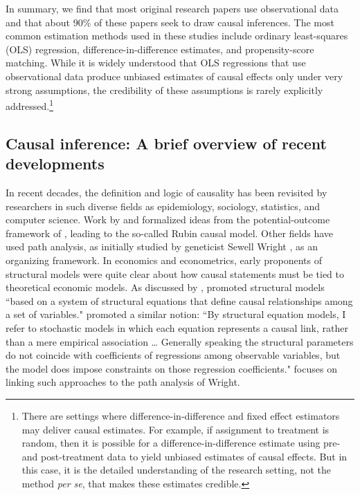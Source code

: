 \documentclass[12pt,reqno,titlepage]{amsart}
\begin{document}
\begin{doublespace}
In summary, we find that most original research papers use observational data and that about 90\% of these papers seek to draw causal inferences.
The most common estimation methods used in these studies include ordinary least-squares (OLS) regression, difference-in-difference estimates, and propensity-score matching.
While it is widely understood that OLS regressions that use observational data produce unbiased estimates of causal effects only under very strong assumptions, the credibility of these assumptions is rarely explicitly addressed.\footnote{
There are settings where difference-in-difference and fixed effect estimators may deliver causal estimates.
For example, if assignment to treatment is random, then it is possible for a difference-in-difference estimate using pre- and post-treatment data to yield unbiased estimates of causal effects.
But in this case, it is the detailed understanding of the research setting, not the method \emph{per se}, that makes these estimates credible.}

\subsection{Causal inference: A brief overview of recent developments}
In recent decades, the definition and logic of causality has been revisited by researchers in such diverse fields as epidemiology, sociology, statistics, and computer science. 
Work by \citet{Rubin:1974im,Rubin:1977dv} and \citet{Holland:1986p7458} formalized ideas from the potential-outcome framework of \citet{Neyman:1923aa}, leading to the so-called Rubin causal model. 
Other fields have used path analysis, as initially studied by geneticist Sewell Wright \citep{Wright:1921aa}, as an organizing framework.
In economics and econometrics, early proponents of structural models were quite clear about how causal statements must be tied to theoretical economic models.
As discussed by \citet{Heckman:2015ez}, \citet{Haavelmo:1943cl,Haavelmo:1944jq} promoted structural models ``based on a system of structural equations that define causal relationships among a set of variables."
\citet[p.\,979]{Goldberger:1972cq} promoted a similar notion: 
``By structural equation models, I refer to stochastic models in which each equation represents a causal link, rather than a mere empirical association \dots
Generally speaking the structural parameters do not coincide with coefficients of regressions among observable variables, but the model does impose constraints on those regression coefficients."
\citet{Goldberger:1972cq} focuses on linking such approaches to the path analysis of Wright.


\end{doublespace}
\end{document}

